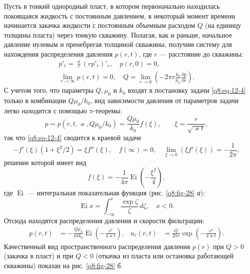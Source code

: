 Пусть в тонкий однородный пласт, в котором первоначально находилась покоящаяся жидкость с постоянным давлением, в некоторый момент времени начинается закачка жидкости с постоянным объемным расходом $Q$ (на единицу толщины пласта) через тонкую скважину. Полагая, как и раньше, начальное давление нулевым и пренебрегая толщиной скважины, получим систему для нахождения распределения давления $p(r,t)$, где $r$ ---
расстояние до скважины:
\begin{equation}\begin{gathered}
p'_t=\frac{\varkappa}{r}(rp'_r)'_r,\quad p(r,0)=0,\\
\lim_{r\to\infty}p(r,t)=0,\quad Q=\lim_{r\to0}\left(-2\pi r\frac{k_0}{\mu_0}\frac{\partial p}{\partial r}\right).
\end{gathered}\tag{12.4}\label{q8:eq-12-4}\end{equation}
С учетом того, что параметры $Q,\mu_0$ и $k_0$ входят в постановку задачи \eqref{q8:eq-12-4} только в комбинации $Q\mu_0/k_0$, вид зависимости давления от параметров задачи легко находится с помощью $\pi$-теоремы:
\[
p=p(r,t,\varkappa,Q\mu_0/k_0)=\frac{Q\mu_0}{k_0}f(\xi),\qquad\xi=\frac{r}{\sqrt{\varkappa t}},
\]
так что \eqref{q8:eq-12-4} сводится к краевой задаче
\[
-f'(\xi)(1+\xi^2/2)=\xi f''(\xi),\quad f(\infty)=0,\quad\lim_{\xi\to0}(\xi f'(\xi))=-\frac{1}{2\pi},
\]
решение которой имеет вид
\begin{equation}
f(\xi)=-\frac{1}{4\pi}\operatorname{Ei}\left(-\frac{\xi^2}{4}\right),\tag{12.5}\label{q8:eq-12-5}
\end{equation}
где $\operatorname{Ei}$ --- интегральная показательная функция (рис. \ref{q8:fig-28} \textit{а}):
\[
\operatorname{Ei}x=\int_{-\infty}^x\frac{\exp\zeta}{\zeta}\,d\zeta,\quad x<0.
\]
Отсюда находятся распределения давления и скорости фильтрации:
\begin{equation}\begin{aligned}
p(r,t)&=-\frac{Q\mu_0}{4\pi k_0}\operatorname{Ei}\left(-\frac{r^2}{4\varkappa t}\right),&u_r(r,t)&=\frac{Q}{2\pi r}\exp\left(-\frac{r^2}{4\varkappa t}\right).
\end{aligned}\tag{12.6}\label{q8:eq-12-6}\end{equation}
Качественный вид пространственного распределения давления $p(r)$ при $Q>0$ (закачка в пласт) и при $Q<0$ (откачка из пласта или остановка работающей скважины) показан на рис. \ref{q8:fig-28} \textit{б}.

